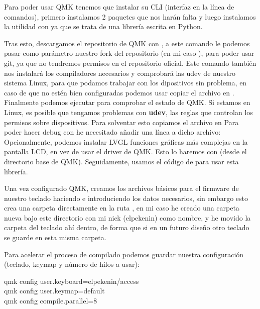 Para poder usar QMK tenemos que instalar su CLI (interfaz en la línea de comandos), primero instalamos 2 paquetes que nos harán falta  y luego instalamos la utilidad con  ya que se trata de una librería escrita en Python.

Tras esto, descargamos el repositorio de QMK con , a este comando le podemos pasar como parámetro nuestro fork del repositorio (en mi caso ), para poder usar git, ya que no tendremos permisos en el repositorio oficial. Este comando también nos instalará los compiladores necesarios y comprobará las udev de nuestro sistema Linux, para que podamos trabajar con los dipositivos sin problema, en caso de que no estén bien configuradas podemos usar copiar el archivo  en . Finalmente podemos ejecutar  para comprobar el estado de QMK.
Si estamos en Linux, es posible que tengamos problemas con \textbf{udev}, las reglas que controlan los permisos sobre dispositivos. Para solventar esto copiamos el archivo  en  
Para poder hacer debug con  he necesitado añadir una línea a dicho archivo: \newline
{} \vspace{0.5cm} 
Opcionalmente, podemos instalar LVGL funciones gráficas más complejas en la pantalla LCD, en vez de usar el driver de QMK. Esto lo haremos con \newline
{} (desde el directorio base de QMK). Seguidamente, usamos el código de  para usar esta librería. \mybreak

Una vez configurado QMK, creamos los archivos básicos para el firmware de nuestro teclado haciendo  e introduciendo los datos necesarios, sin embargo esto crea una carpeta directamente en la ruta , en mi caso he creado una carpeta nueva bajo este directorio con mi nick (elpekenin) como nombre, y he movido la carpeta del teclado ahí dentro, de forma que si en un futuro diseño otro teclado se guarde en esta misma carpeta.

Para acelerar el proceso de compilado podemos guardar nuestra configuración (teclado, keymap y número de hilos a usar):
\begin{multicli}
    \cliarrow qmk config user.keyboard=elpekenin/access  \\
    \cliarrow qmk config user.keymap=default \\
    \cliarrow qmk config compile.parallel=8
\end{multicli}

